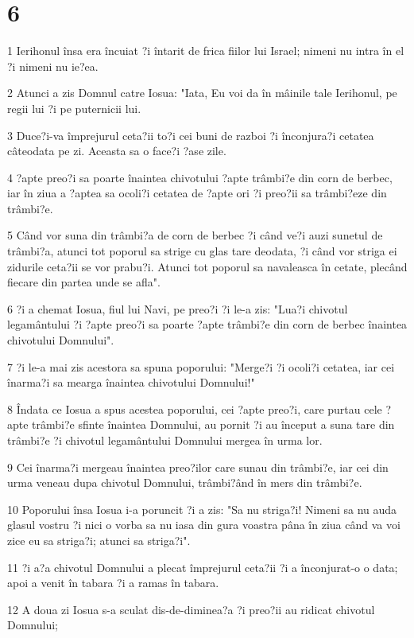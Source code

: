 \chapter{6}

\par 1 Ierihonul însa era încuiat ?i întarit de frica fiilor lui Israel; nimeni nu intra în el ?i nimeni nu ie?ea.
\par 2 Atunci a zis Domnul catre Iosua: "Iata, Eu voi da în mâinile tale Ierihonul, pe regii lui ?i pe puternicii lui.
\par 3 Duce?i-va împrejurul ceta?ii to?i cei buni de razboi ?i înconjura?i cetatea câteodata pe zi. Aceasta sa o face?i ?ase zile.
\par 4 ?apte preo?i sa poarte înaintea chivotului ?apte trâmbi?e din corn de berbec, iar în ziua a ?aptea sa ocoli?i cetatea de ?apte ori ?i preo?ii sa trâmbi?eze din trâmbi?e.
\par 5 Când vor suna din trâmbi?a de corn de berbec ?i când ve?i auzi sunetul de trâmbi?a, atunci tot poporul sa strige cu glas tare deodata, ?i când vor striga ei zidurile ceta?ii se vor prabu?i. Atunci tot poporul sa navaleasca în cetate, plecând fiecare din partea unde se afla".
\par 6 ?i a chemat Iosua, fiul lui Navi, pe preo?i ?i le-a zis: "Lua?i chivotul legamântului ?i ?apte preo?i sa poarte ?apte trâmbi?e din corn de berbec înaintea chivotului Domnului".
\par 7 ?i le-a mai zis acestora sa spuna poporului: "Merge?i ?i ocoli?i cetatea, iar cei înarma?i sa mearga înaintea chivotului Domnului!"
\par 8 Îndata ce Iosua a spus acestea poporului, cei ?apte preo?i, care purtau cele ?apte trâmbi?e sfinte înaintea Domnului, au pornit ?i au început a suna tare din trâmbi?e ?i chivotul legamântului Domnului mergea în urma lor.
\par 9 Cei înarma?i mergeau înaintea preo?ilor care sunau din trâmbi?e, iar cei din urma veneau dupa chivotul Domnului, trâmbi?ând în mers din trâmbi?e.
\par 10 Poporului însa Iosua i-a poruncit ?i a zis: "Sa nu striga?i! Nimeni sa nu auda glasul vostru ?i nici o vorba sa nu iasa din gura voastra pâna în ziua când va voi zice eu sa striga?i; atunci sa striga?i".
\par 11 ?i a?a chivotul Domnului a plecat împrejurul ceta?ii ?i a înconjurat-o o data; apoi a venit în tabara ?i a ramas în tabara.
\par 12 A doua zi Iosua s-a sculat dis-de-diminea?a ?i preo?ii au ridicat chivotul Domnului;
